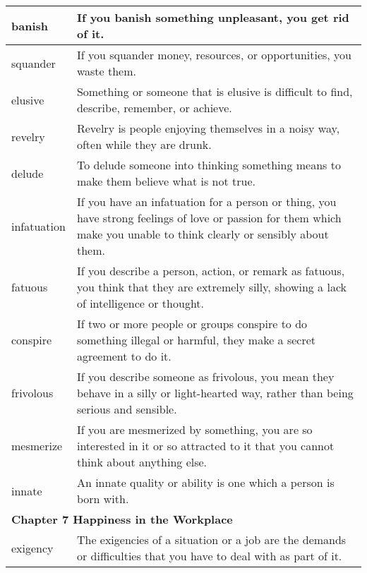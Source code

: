 \documentclass{article}
\begin{document}
\begin{center}
\begin{longtable}{|l|p{9cm}|}
\hline
banish
&
If you banish something unpleasant, you get rid of it.
\\

\hline
squander
&
If you squander money, resources, or opportunities, you waste them.
\\

\hline
elusive
&
Something or someone that is elusive is difficult to find, describe, remember, or achieve.
\\

\hline
revelry
&
Revelry is people enjoying themselves in a noisy way, often while they are drunk.
\\

\hline
delude
&
To delude someone into thinking something means to make them believe what is not true.
\\

\hline
infatuation
&
If you have an infatuation for a person or thing, you have strong feelings of love or passion for them which make you unable to think clearly or sensibly about them.
\\

\hline
fatuous
&
If you describe a person, action, or remark as fatuous, you think that they are extremely silly, showing a lack of intelligence or thought.
\\

\hline
conspire
&
If two or more people or groups conspire to do something illegal or harmful, they make a secret agreement to do it.
\\

\hline
frivolous
&
If you describe someone as frivolous, you mean they behave in a silly or light-hearted way, rather than being serious and sensible.
\\

\hline
mesmerize
&
If you are mesmerized by something, you are so interested in it or so attracted to it that you cannot think about anything else.
\\

\hline
innate
&
An innate quality or ability is one which a person is born with.
\\

\hline
\multicolumn{2}{|l|}{\textbf{Chapter 7 Happiness in the Workplace}}
\\

\hline
exigency
&
The exigencies of a situation or a job are the demands or difficulties that you have to deal with as part of it.
\\


\end{longtable}
\end{center}
\end{document}
